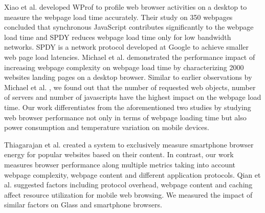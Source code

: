 \documentclass{sig-alternate-10pt}
\begin{document}
Xiao et al. \cite{Xiao} developed WProf to  profile web browser activities on a desktop to measure the webpage load time accurately. Their study on 350 webpages  concluded   that synchronous JavaScript contributes significantly to the webpage load time and  SPDY  \cite{misc15} reduces webpage load time only for low bandwidth networks. SPDY is  a network protocol  developed  at Google to achieve smaller web page load latencies. Michael et al. \cite{micheal} demonstrated the performance impact of  increasing webpage complexity  on webpage load time  by characterizing   2000 websites landing pages on a desktop browser. Similar to earlier observations by Michael et al. \cite{micheal}, we found out that the    number of requested web objects, number of servers and number of javascripts   have the highest impact on the webpage load time.   Our work differentiates from the aforementioned two studies  by  studying  web browser performance not only in terms of webpage loading time but also power consumption and temperature variation on mobile devices. 

Thiagarajan et al. \cite{Thiagarajan} created a system to exclusively measure smartphone browser energy for popular websites based on their content.  In contrast, our work measures browser performance along multiple metrics taking into account    webpage complexity, webpage content and different application protocols.   Qian et al. \cite{web} suggested  factors including protocol overhead, webpage content and caching  affect resource utilization for mobile web browsing. We measured  the impact of similar factors on Glass and smartphone browsers.
\end{document}
